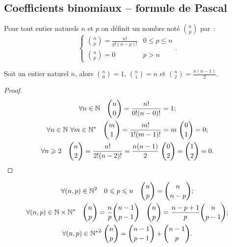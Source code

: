 \subsection{Coefficients binomiaux -- formule de Pascal}

\begin{defdef}
  Pour tout entier naturels $n$ et $p$ on définit un nombre noté $\binom{n}{p}$ par~:
  \begin{equation}
    \begin{cases}
      \binom{n}{p}=\frac{n!}{p!(n-p)!} & 0\leqslant p \leqslant n \\
      \binom{n}{p}=0 & p > n
    \end{cases}.
  \end{equation}
\end{defdef}
\begin{prop}
  Soit un entier naturel $n$, alors $\binom{n}{0}=1$, $\binom{n}{1}=n$ et $\binom{n}{2}=\frac{n(n-1)}{2}$.
\end{prop}
\begin{proof}
  \begin{gather}
    \forall n \in \N \quad \binom{n}{0}=\frac{n!}{0!(n-0)!}=1; \\
    \forall n \in \N \ \forall m\in \N^* \quad \binom{m}{1}=\frac{m!}{1!(m-1)!}=m \ \binom{0}{1}=0;\\
    \forall n \geqslant 2 \quad \binom{n}{2}=\frac{n!}{2!(n-2)!}=\frac{n(n-1)}{2} \ \binom{0}{2}=\binom{1}{2}=0.
  \end{gather}
\end{proof}
\begin{prop}
  \begin{gather}
    \forall (n,p)\in\N^2 \quad 0\leqslant p \leqslant n \quad \binom{n}{p}=\binom{n}{n-p};\\
    \forall (n,p)\in\N\times\N^* \quad \binom{n}{p}=\frac{n}{p}\binom{n-1}{p-1} \quad \binom{n}{p}=\frac{n-p+1}{p}\binom{n}{p-1};\\
    \forall (n,p)\in{\N^*}^2 \ \binom{n}{p}=\binom{n-1}{p-1}+\binom{n-1}{p}.
  \end{gather}
\end{prop}
